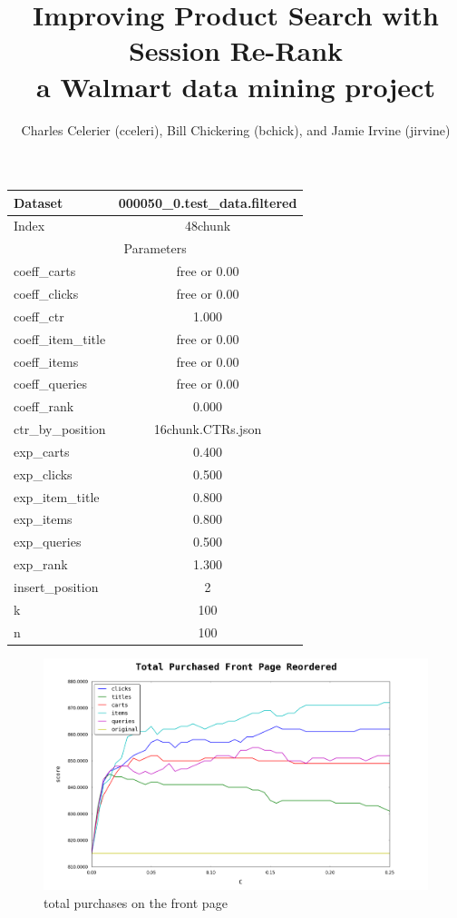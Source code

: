 \documentclass{article}
\title{Improving Product Search with Session Re-Rank\\
    \large{a Walmart data mining project}}
\author{Charles Celerier (cceleri), Bill Chickering (bchick),
        and Jamie Irvine (jirvine)}
\begin{document}
\maketitle

\begin{center}
    \begin{tabular}{| l | c |}
        \hline
        Dataset & 000050\_0.test\_data.filtered \\ \hline
        Index & 48chunk \\ \hline
        \hline
        \multicolumn{2}{|c|}{Parameters} \\ \hline
        coeff\_carts & free or 0.00 \\ \hline
        coeff\_clicks & free or 0.00 \\ \hline
        coeff\_ctr & 1.000 \\ \hline
        coeff\_item\_title & free or 0.00 \\ \hline
        coeff\_items & free or 0.00 \\ \hline
        coeff\_queries & free or 0.00 \\ \hline
        coeff\_rank & 0.000 \\ \hline
        ctr\_by\_position & 16chunk.CTRs.json \\ \hline
        exp\_carts & 0.400 \\ \hline
        exp\_clicks & 0.500 \\ \hline
        exp\_item\_title & 0.800 \\ \hline
        exp\_items & 0.800 \\ \hline
        exp\_queries & 0.500 \\ \hline
        exp\_rank & 1.300 \\ \hline
        insert\_position & 2 \\ \hline
        k & 100 \\ \hline
        n & 100 \\ \hline
  \end{tabular}
\end{center}

\begin{figure}[htbp!]
\centering
\includegraphics[width=\textwidth]{000050_0.48chunk.k100.i2.n100.total_purchased_front_page.0-0.25.png}
\caption{total purchases on the front page}
\label{fig:total_purchases_on_the_front_page}
\end{figure}
\end{document}
